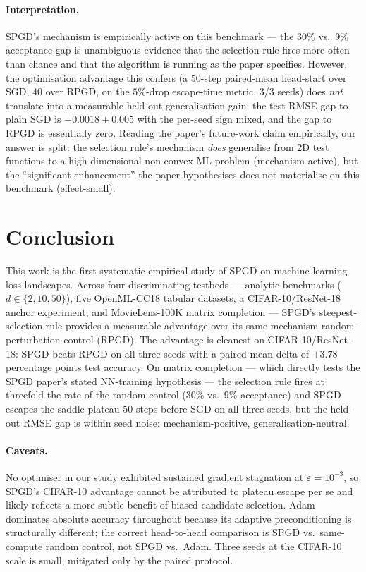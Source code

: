 \documentclass[11pt]{article}
\begin{document}
\paragraph{Interpretation.}
SPGD's mechanism is empirically active on this benchmark --- the
$30\%$ vs.\ $9\%$ acceptance gap is unambiguous evidence that the
selection rule fires more often than chance and that the algorithm is
running as the paper specifies.  However, the optimisation advantage
this confers (a $50$-step paired-mean head-start over SGD, $40$ over
RPGD, on the $5\%$-drop escape-time metric, 3/3 seeds) does
\emph{not} translate into a measurable held-out generalisation gain: the test-RMSE gap to plain SGD is
$-0.0018 \pm 0.005$ with the per-seed sign mixed, and the gap to RPGD
is essentially zero.  Reading the paper's future-work claim
empirically, our answer is split: the selection rule's mechanism
\emph{does} generalise from 2D test functions to a high-dimensional
non-convex ML problem (mechanism-active), but the ``significant
enhancement'' the paper hypothesises does not materialise on this
benchmark (effect-small).
\FloatBarrier

\section{Conclusion}
\label{sec:conclusion}

This work is the first systematic empirical study of SPGD on
machine-learning loss landscapes.  Across four discriminating
testbeds --- analytic benchmarks ($d \in \{2,10,50\}$), five
OpenML-CC18 tabular datasets, a CIFAR-10/ResNet-18 anchor experiment,
and MovieLens-100K matrix completion --- SPGD's steepest-selection
rule provides a measurable advantage over its same-mechanism
random-perturbation control (RPGD).  The advantage is cleanest on
CIFAR-10/ResNet-18: SPGD beats RPGD on all three seeds with a
paired-mean delta of $+3.78$ percentage points test accuracy.  On
matrix completion --- which directly tests the SPGD paper's stated
NN-training hypothesis \citep[Conclusion]{vahedi2024spgd} --- the
selection rule fires at threefold the rate of the random control
($30\%$ vs.\ $9\%$ acceptance) and SPGD escapes the saddle plateau
$50$ steps before SGD on all three seeds, but the held-out RMSE
gap is within seed noise: mechanism-positive, generalisation-neutral.

\paragraph{Caveats.}  No optimiser in our study exhibited sustained
gradient stagnation at $\varepsilon = 10^{-3}$, so SPGD's CIFAR-10
advantage cannot be attributed to plateau escape per se and likely
reflects a more subtle benefit of biased candidate selection.
Adam dominates absolute accuracy throughout because its adaptive
preconditioning is structurally different; the correct head-to-head
comparison is SPGD vs.\ same-compute random control, not SPGD vs.\
Adam.  Three seeds at the CIFAR-10 scale is small, mitigated only
by the paired protocol.
\end{document}
